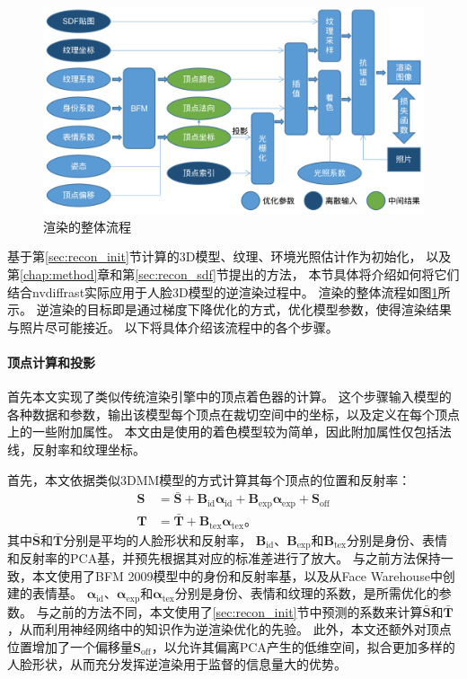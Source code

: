 \begin{figure}
\centering
\includegraphics[width=\linewidth]{figures/recon_render}
\caption{渲染的整体流程}
\label{fig:recon_render}
\end{figure}

基于第\ref{sec:recon_init}节计算的3D模型、纹理、环境光照估计作为初始化，
以及第\ref{chap:method}章和第\ref{sec:recon_sdf}节提出的方法，
本节具体将介绍如何将它们结合nvdiffrast\citep{nvdiffrast}实际应用于人脸3D模型的逆渲染过程中。
渲染的整体流程如图\ref{fig:recon_render}所示。
逆渲染的目标即是通过梯度下降优化的方式，优化模型参数，使得渲染结果与照片尽可能接近。
以下将具体介绍该流程中的各个步骤。

\paragraph{顶点计算和投影}
首先本文实现了类似传统渲染引擎中的顶点着色器的计算。
这个步骤输入模型的各种数据和参数，输出该模型每个顶点在裁切空间中的坐标，以及定义在每个顶点上的一些附加属性。
本文由是使用的着色模型较为简单，因此附加属性仅包括法线，反射率和纹理坐标。

首先，本文依据类似3DMM模型的方式计算其每个顶点的位置和反射率：
\begin{align}
\mathbf{S} &= \bar{\mathbf{S}} +
\mathbf{B}_\mathrm{id}\mathbf{\alpha}_\mathrm{id} +
\mathbf{B}_\mathrm{exp}\mathbf{\alpha}_\mathrm{exp} +
\mathbf{S}_\mathrm{off}\\
\mathbf{T} &= \bar{\mathbf{T}} +
\mathbf{B}_\mathrm{tex}\mathbf{\alpha}_\mathrm{tex}
\text{。}
\end{align}
其中$\bar{\mathbf{S}}$和$\bar{\mathbf{T}}$分别是平均的人脸形状和反射率，
$\mathbf{B}_\mathrm{id}$、$\mathbf{B}_\mathrm{exp}$和$\mathbf{B}_\mathrm{tex}$分别是身份、表情和反射率的PCA基，并预先根据其对应的标准差进行了放大。
与之前方法\citep{deep3d,GuoZCJZ19}保持一致，本文使用了BFM 2009模型\citep{BFM}中的身份和反射率基，以及从Face Warehouse\citep{FaceWarehouse}中创建的表情基。
$\mathbf{\alpha}_\mathrm{id}$、$\mathbf{\alpha}_\mathrm{exp}$和$\mathbf{\alpha}_\mathrm{tex}$分别是身份、表情和纹理的系数，是所需优化的参数。
与之前的方法不同，本文使用了\ref{sec:recon_init}节中预测的系数来计算$\bar{\mathbf{S}}$和$\bar{\mathbf{T}}$，从而利用神经网络中的知识作为逆渲染优化的先验。
此外，本文还额外对顶点位置增加了一个偏移量$\mathbf{S}_\mathrm{off}$，以允许其偏离PCA产生的低维空间，拟合更加多样的人脸形状，从而充分发挥逆渲染用于监督的信息量大的优势。

